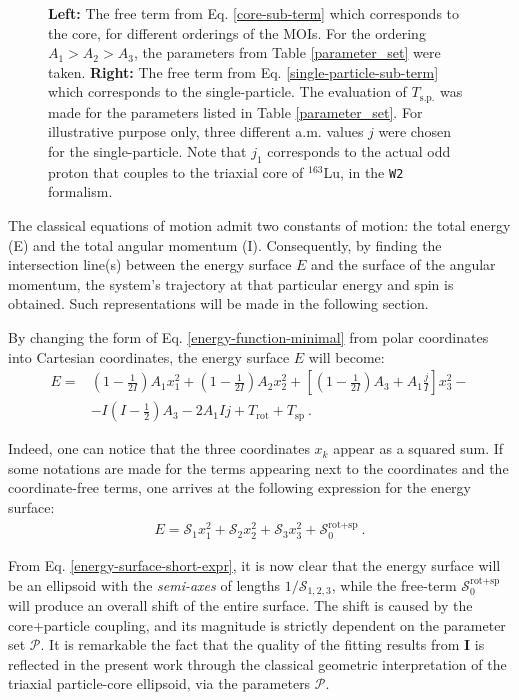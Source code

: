 \documentclass[myclassdoc,debug]{rjparticle}
\begin{document}
\begin{figure}
\begin{minipage}{.5\textwidth}
\end{minipage}
\caption{\textbf{Left:} The free term from Eq. \ref{core-sub-term} which corresponds to the core, for different orderings of the MOIs. For the ordering $A_1>A_2>A_3$, the parameters from Table \ref{parameter_set} were taken. \textbf{Right:} The free term from Eq. \ref{single-particle-sub-term} which corresponds to the single-particle. The evaluation of $T_\text{s.p.}$ was made for the parameters listed in Table \ref{parameter_set}. For illustrative purpose only, three different a.m. values $j$ were chosen for the single-particle. Note that $j_1$ corresponds to the actual odd proton that couples to the triaxial core of $^{163}$Lu, in the \texttt{W2} formalism.}
    \label{sub_terms}
\end{figure}

The classical equations of motion admit two constants of motion: the total energy (E) and the total angular momentum (I).  Consequently, by finding the intersection line(s) between the energy surface $E$ and the surface of the angular momentum, the system's trajectory at that particular energy and spin is obtained. Such representations will be made in the following section.

By changing the form of Eq. \ref{energy-function-minimal} from polar coordinates into Cartesian coordinates, the energy surface $E$ will become:
\begin{align}
    E=&\left(1-\frac{1}{2I}\right)A_1x_1^2+\left(1-\frac{1}{2I}\right)A_2x_2^2+\left[\left(1-\frac{1}{2I}\right)A_3+A_1\frac{j}{I}\right]x_3^2-\nonumber\\
    &-I\left(I-\frac{1}{2}\right)A_3-2A_1Ij+T_\text{rot}+T_\text{sp}\ .
    \label{energy-ellipsoid-cartesian}
\end{align}

Indeed, one can notice that the three coordinates $x_k$ appear as a squared sum. If some notations are made for the terms appearing next to the coordinates and the coordinate-free terms, one arrives at the following expression for the energy surface:
\begin{align}
    E=\mathcal{S}_1x_1^2+\mathcal{S}_2x_2^2+\mathcal{S}_3x_3^2+\mathcal{S}_0^\text{rot+sp}\ .
    \label{energy-surface-short-expr}
\end{align}

From Eq. \ref{energy-surface-short-expr}, it is now clear that the energy surface will be an ellipsoid with the \emph{semi-axes} of lengths $1/\mathcal{S}_{1,2,3}$, while the free-term $\mathcal{S}_0^\text{rot+sp}$ will produce an overall shift of the entire surface. The shift is caused by the core+particle coupling, and its magnitude is strictly dependent on the parameter set $\mathcal{P}$. It is remarkable the fact that the quality of the fitting results from \textbf{I} is reflected in the present work through the classical geometric interpretation of the triaxial particle-core ellipsoid, via the parameters $\mathcal{P}$.
\end{document}
